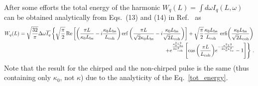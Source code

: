 After some efforts the total energy of the harmonic $W_q (L)=\int d \omega I_q(L, \omega)$
can be obtained analytically from Eqs.~(13) and (14) in Ref.~\cite{KhokhlovaStrelkov} as
\begin{equation}
\begin{split}
W_q (L) = \sqrt{\frac{32}{\pi}} \Delta \omega \overline{I_q} 
\left\{
    \sqrt{\frac{\pi}{2}} 
    \Re{ 
        \left[ 
            \left( 
                \frac{\pi L}{\kappa_0 L_\mathrm{bs}} - i \frac{\kappa_0 L_\mathrm{bs}}{ L_\mathrm{coh}} 
            \right)
        \erf{
            \left(
                \frac{\pi L}{\sqrt{2} \kappa_0 L_\mathrm{bs}} - i \frac{\kappa_0 L_\mathrm{bs}}{\sqrt{2} L_\mathrm{coh}} 
            \right)
        }
       \right]
   } 
   + \sqrt{\frac{\pi}{2}} \frac{\kappa_0 L_\mathrm{bs}}{ L_\mathrm{coh}} \ 
   \mathrm{erfi} {\left( 
   \frac{\kappa_0 L_\mathrm{bs}}{\sqrt{2} L_\mathrm{coh}}
   \right)} \right. \\ \left.
   + e^{\frac{\kappa_0^2 L^2_\mathrm{bs}}{2 L^2_\mathrm{coh}}} 
   \left[
        \cos{
            \left( \frac{\pi L}{L_\mathrm{coh}} \right)
            } 
        e^{-\frac{\pi^2 L^2}{2 \kappa_0^2 L^2_\mathrm{bs}}} -1
    \right]    
\right\} \, .
\end{split}
\label{tot_energy}
\end{equation}
Note that the result for the chirped and the non-chirped pulse is the same (thus containing only $\kappa_0$, not $\kappa$) due to the analyticity of the Eq.~\eqref{tot_energy}. 

